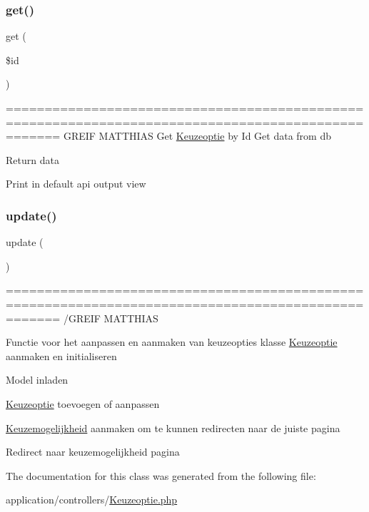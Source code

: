 \subsubsection{\texorpdfstring{get()}{get()}}
{\footnotesize\ttfamily get (\begin{DoxyParamCaption}\item[{}]{\$id }\end{DoxyParamCaption})}

=================================================================================================== G\+R\+E\+IF M\+A\+T\+T\+H\+I\+AS Get \mbox{\hyperlink{class_keuzeoptie}{Keuzeoptie}} by Id Get data from db

Return data

Print in default api output view \mbox{\label{class_keuzeoptie_a842e4774e3b3601a005b995c02f7e883}} 
\subsubsection{\texorpdfstring{update()}{update()}}
{\footnotesize\ttfamily update (\begin{DoxyParamCaption}{ }\end{DoxyParamCaption})}



=================================================================================================== /\+G\+R\+E\+IF M\+A\+T\+T\+H\+I\+AS 

Functie voor het aanpassen en aanmaken van keuzeopties klasse \mbox{\hyperlink{class_keuzeoptie}{Keuzeoptie}} aanmaken en initialiseren

Model inladen

\mbox{\hyperlink{class_keuzeoptie}{Keuzeoptie}} toevoegen of aanpassen

\mbox{\hyperlink{class_keuzemogelijkheid}{Keuzemogelijkheid}} aanmaken om te kunnen redirecten naar de juiste pagina

Redirect naar keuzemogelijkheid pagina 

The documentation for this class was generated from the following file\+:\begin{DoxyCompactItemize}
\item 
application/controllers/\mbox{\hyperlink{_keuzeoptie_8php}{Keuzeoptie.\+php}}\end{DoxyCompactItemize}
